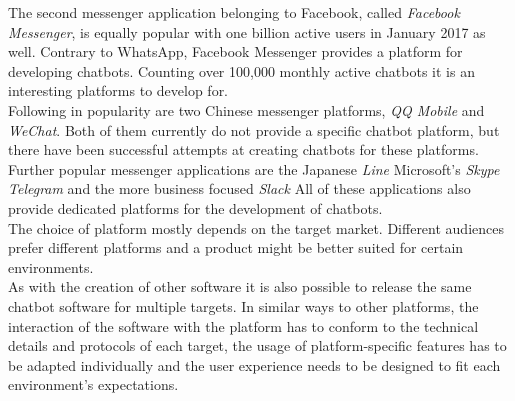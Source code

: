 The second messenger application belonging to Facebook, called \emph{Facebook Messenger}, is equally popular with one billion active users in January 2017\cite{fbpopular} as well. Contrary to WhatsApp, Facebook Messenger provides a platform for developing chatbots. Counting over 100,000 monthly active chatbots\cite{messenger} it is an interesting platforms to develop for.
\\

Following in popularity\cite{appusage} are two Chinese messenger platforms, \emph{QQ Mobile} and \emph{WeChat}. Both of them currently do not provide a specific chatbot platform, but there have been successful attempts at creating chatbots for these platforms\cite{wechatbot}.
\\

Further popular messenger applications are the Japanese \emph{Line} Microsoft's \emph{Skype} \emph{Telegram} and the more business focused \emph{Slack} All of these applications also provide dedicated platforms for the development of chatbots.
\\

The choice of platform mostly depends on the target market. Different audiences prefer different platforms and a product might be better suited for certain environments.
\\
As with the creation of other software it is also possible to release the same chatbot software for multiple targets. In similar ways to other platforms, the interaction of the software with the platform has to conform to the technical details and protocols of each target, the usage of platform-specific features has to be adapted individually and the user experience needs to be designed to fit each environment's expectations.
